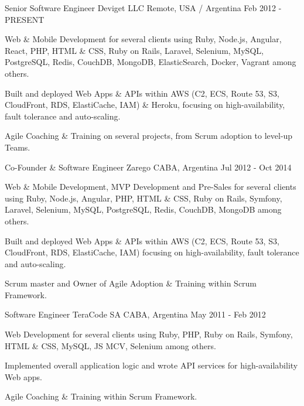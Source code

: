 
\begin{cventries}

  \cventry
    {Senior Software Engineer}
    {Deviget LLC}
    {Remote, USA / Argentina}
    {Feb 2012 - PRESENT}
    {
      \begin{cvitems}
        \item {Web \& Mobile Development for several clients using Ruby, Node.js, Angular, React, PHP, HTML \& CSS, Ruby on Rails, Laravel, Selenium, MySQL, PostgreSQL, Redis, CouchDB, MongoDB, ElasticSearch, Docker, Vagrant among others.}
        \item {Built and deployed Web Apps \& APIs within AWS (C2, ECS, Route 53, S3, CloudFront, RDS, ElastiCache, IAM) \& Heroku, focusing on high-availability, fault tolerance and auto-scaling.}
        \item {Agile Coaching \& Training on several projects, from Scrum adoption to level-up Teams.}
      \end{cvitems}
    }

  \cventry
    {Co-Founder \& Software Engineer}
    {Zarego}
    {CABA, Argentina}
    {Jul 2012 - Oct 2014}
    {
      \begin{cvitems}
        \item {Web \& Mobile Development, MVP Development and Pre-Sales for several clients using Ruby, Node.js, Angular, PHP, HTML \& CSS, Ruby on Rails, Symfony, Laravel, Selenium, MySQL, PostgreSQL, Redis, CouchDB, MongoDB  among others.}
        \item {Built and deployed Web Apps \& APIs within AWS (C2, ECS, Route 53, S3, CloudFront, RDS, ElastiCache, IAM) focusing on high-availability, fault tolerance and auto-scaling.}
		\item {Scrum master and Owner of Agile Adoption \& Training within Scrum Framework.}
      \end{cvitems}
    }

  \cventry
    {Software Engineer}
    {TeraCode SA}
    {CABA, Argentina}
    {May 2011 - Feb 2012}
    {
      \begin{cvitems}
        \item {Web Development for several clients using Ruby, PHP, Ruby on Rails, Symfony, HTML \& CSS, MySQL, JS MCV, Selenium among others.}
        \item {Implemented overall application logic and wrote API services for high-availability Web apps.}
        \item {Agile Coaching \& Training within Scrum Framework.}
      \end{cvitems}
    }
   

\end{cventries}
